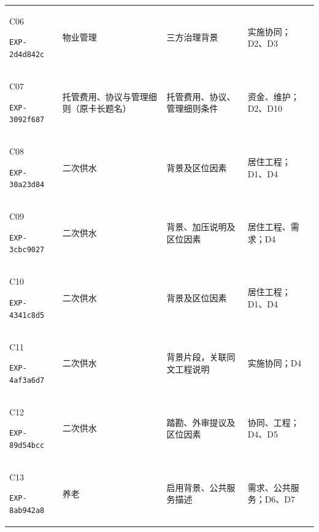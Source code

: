 \documentclass[UTF8,11pt,fontset=windows]{ctexart}
\begin{document}
{\begin{longtable}{@{}L{29mm}L{36mm}L{56mm}L{32mm}@{}}
\hypertarget{EXP-2d4d842c-d9f9-4eac-ad97-93d8fe87533a}{C06}\newline\texttt{EXP-2d4d842c} & 物业管理 & 三方治理背景 & 实施协同；D2、D3\\
\hypertarget{EXP-3092f687-50c6-452e-b1d1-5703c250c25e}{C07}\newline\texttt{EXP-3092f687} & 托管费用、协议与管理细则（原卡长题名） & 托管费用、协议、管理细则条件 & 资金、维护；D2、D10\\
\hypertarget{EXP-30a23d84-6fb1-43ce-af5a-02a79ee0a4b6}{C08}\newline\texttt{EXP-30a23d84} & 二次供水 & 背景及区位因素 & 居住工程；D1、D4\\
\hypertarget{EXP-3cbc9027-6c40-49c6-9767-edec50043a5f}{C09}\newline\texttt{EXP-3cbc9027} & 二次供水 & 背景、加压说明及区位因素 & 居住工程、需求；D4\\
\hypertarget{EXP-4341c8d5-94be-4abf-aaa6-46130f911157}{C10}\newline\texttt{EXP-4341c8d5} & 二次供水 & 背景及区位因素 & 居住工程；D1、D4\\
\hypertarget{EXP-4af3a6d7-54d9-4dd2-aa5c-cf3d02ddf96b}{C11}\newline\texttt{EXP-4af3a6d7} & 二次供水 & 背景片段，关联同文工程说明 & 实施协同；D4\\
\hypertarget{EXP-89d54bcc-fc1f-4431-be62-7a06bce77e41}{C12}\newline\texttt{EXP-89d54bcc} & 二次供水 & 踏勘、外审提议及区位因素 & 协同、工程；D4、D5\\
\hypertarget{EXP-8ab942a8-bdac-4075-97da-46b09ee9aa41}{C13}\newline\texttt{EXP-8ab942a8} & 养老 & 启用背景、公共服务描述 & 需求、公共服务；D6、D7\\

\end{longtable}}
\end{document}
